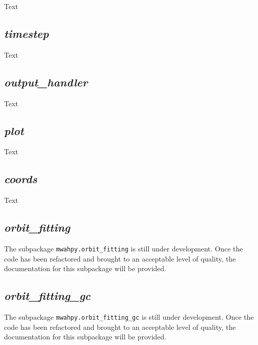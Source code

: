 \documentclass{article}
\begin{document}
Text

\subsection{\textit{timestep}} \label{sec:doc_timestep}

Text

\subsection{\textit{output\_handler}}

Text

\subsection{\textit{plot}}

Text

\subsection{\textit{coords}}

Text

\subsection{\textit{orbit\_fitting}}

The subpackage \verb!mwahpy.orbit_fitting! is still under development. Once the code has been refactored and brought to an acceptable level of quality, the documentation for this subpackage will be provided. 

\subsection{\textit{orbit\_fitting\_gc}}

The subpackage \verb!mwahpy.orbit_fitting_gc! is still under development. Once the code has been refactored and brought to an acceptable level of quality, the documentation for this subpackage will be provided.  
\end{document}
